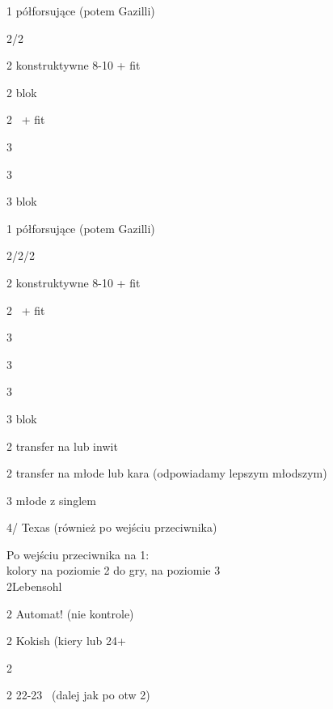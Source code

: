 \documentclass[12pt, a4paper]{report}
\begin{document}
\begin{options}[2]
    \item[1\nt] półforsujące (potem Gazilli)
    \item[2\clubs/2\diams] \gf
    \item[2\hearts] konstruktywne 8-10 + fit
    \item[2\spades] blok \nat
    \item[2\nt] \inv\ + fit
    \item[3\clubs] \inv\ \nat
    \item[3\diams] \inv\ \nat
    \item[3\hearts] blok
\end{options}

\begin{options}[2]
    \item[1\nt] półforsujące (potem Gazilli)
    \item[2\clubs/2\diams/2\hearts] \gf
    \item[2\spades]konstruktywne 8-10 + fit
    \item[2\nt] \inv\ + fit
    \item[3\clubs] \inv\ \nat
    \item[3\diams] \inv\ \nat
    \item[3\hearts] \inv\ \nat\ \nf
    \item[3\spades] blok
\end{options}

\begin{options}[2] 
	\item[2\spades] transfer na \clubs lub inwit
	\item[2\nt] transfer na młode lub kara (odpowiadamy lepszym młodszym)
	\item[3\major] młode z singlem \major
	\item[4\diams/\hearts] Texas (również po wejściu przeciwnika)
\end{options}
Po wejściu przeciwnika na 1\nt:\\
kolory na poziomie 2 do gry, na poziomie 3 \gf\\
2\nt Lebensohl

\begin{options}[2] 
	\item[2\diams] Automat! (nie kontrole)
\end{options}

\begin{options}[1] 
	\item[2\hearts] Kokish (kiery lub 24+ \bal
	\item[2\spades] \nat
	\item[2\nt] 22-23 \bal\ (dalej jak po otw 2\nt)
\end{options}
\end{document}

